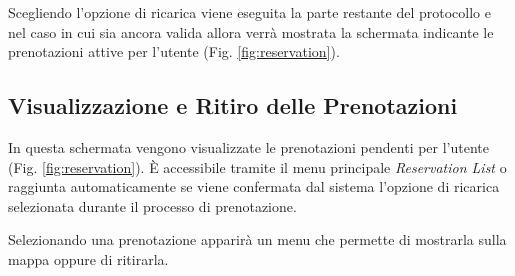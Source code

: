 Scegliendo l'opzione di ricarica viene eseguita la parte restante del protocollo e nel caso in cui sia ancora valida allora verrà mostrata la schermata indicante le prenotazioni attive per l'utente (Fig. \ref{fig:reservation}).

\subsection{Visualizzazione e Ritiro delle Prenotazioni}

In questa schermata vengono visualizzate le prenotazioni pendenti per l'utente (Fig. \ref{fig:reservation}). È accessibile tramite il menu principale \emph{Reservation List} o raggiunta automaticamente se viene confermata dal sistema l'opzione di ricarica selezionata durante il processo di prenotazione. 

Selezionando una prenotazione apparirà un menu che permette di mostrarla sulla mappa oppure di ritirarla.

